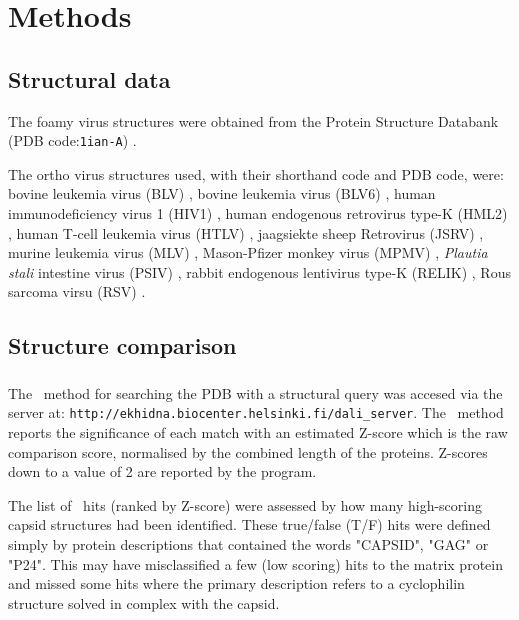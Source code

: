 \section{Methods}

\subsection{Structural data}

The foamy virus structures were obtained from the Protein Structure Databank
(PDB code:{\tt 1ian-A}) \cite{ian}.

The ortho virus structures used, with their shorthand code and PDB code, were:
bovine leukemia virus (BLV) {\tt} \cite{},
bovine leukemia virus (BLV6) {\tt} \cite{},
human immunodeficiency virus 1 (HIV1) {\tt} \cite{},
human endogenous retrovirus type-K (HML2) {\tt} \cite{},
human T-cell leukemia virus (HTLV) {\tt} \cite{},
jaagsiekte sheep Retrovirus (JSRV) {\tt} \cite{},
murine leukemia virus (MLV) {\tt} \cite{},
Mason-Pfizer monkey virus (MPMV) {\tt} \cite{},
{\em Plautia stali} intestine virus (PSIV) {\tt} \cite{},
rabbit endogenous lentivirus type-K (RELIK) {\tt} \cite{},
Rous sarcoma virsu (RSV) {\tt} \cite{}.

\subsection{Structure comparison}

\subsubsection{\DALI}

The \DALI\ method for searching the PDB with a structural query \cite{HolmLet93,HolmLet}
was accesed via the server at:
{\tt http://ekhidna.biocenter.helsinki.fi/dali\_server}.
The \DALI\ method reports the significance of each match with an estimated Z-score
which is the raw comparison score, normalised by the combined length of the proteins.
Z-scores down to a value of 2 are reported by the program.

The list of \DALI\ hits (ranked by Z-score) were assessed by how many high-scoring capsid structures had
been identified.    These true/false (T/F) hits were defined simply by protein descriptions that contained the
words "CAPSID", "GAG" or "P24".   This may have misclassified a few (low scoring) hits to the matrix protein
and missed some hits where the primary description refers to a cyclophilin structure solved in complex 
with the capsid. 

